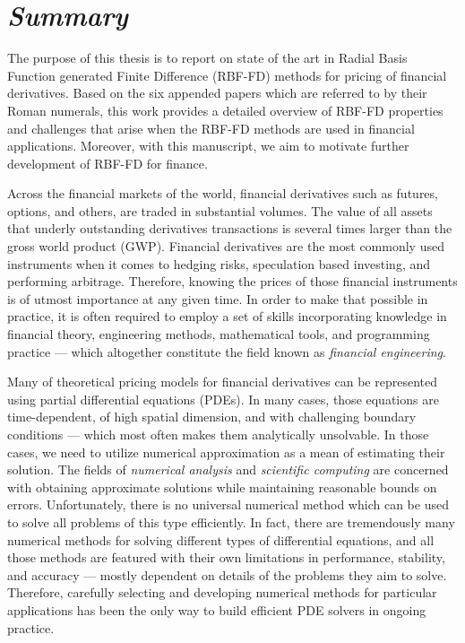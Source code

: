 \documentclass{UUThesisTemplate}
\begin{document}
\chapter{{{\sffamily\emph{Summary}}}}
{\noteunic
\par The purpose of this thesis is to report on state of the art in Radial Basis Function generated Finite Difference (RBF-FD) methods for pricing of financial derivatives. Based on the six appended papers which are referred to by their Roman numerals, this work provides a detailed overview of RBF-FD properties and challenges that arise when the RBF-FD methods are used in financial applications. Moreover, with this manuscript, we aim to motivate further development of RBF-FD for finance.
\par Across the financial markets of the world, financial derivatives such as futures, options, and others, are traded in substantial volumes. The value of all assets that underly outstanding derivatives transactions is several times larger than the gross world product (GWP). Financial derivatives are the most commonly used instruments when it comes to hedging risks, speculation based investing, and performing arbitrage. Therefore, knowing the prices of those financial instruments is of utmost importance at any given time. In order to make that possible in practice, it is often required to employ a set of skills incorporating knowledge in financial theory, engineering methods, mathematical tools, and programming practice --- which altogether constitute the field known as \emph{financial engineering}. 
\par Many of theoretical pricing models for financial derivatives can be represented using partial differential equations (PDEs). In many cases, those equations are time-dependent, of high spatial dimension, and with challenging boundary conditions --- which most often makes them analytically unsolvable. In those cases, we need to utilize numerical approximation as a mean of estimating their solution. The fields of \emph{numerical analysis} and \emph{scientific computing} are concerned with obtaining approximate solutions while maintaining reasonable bounds on errors. Unfortunately, there is no universal numerical method which can be used to solve all problems of this type efficiently. In fact, there are tremendously many numerical methods for solving different types of differential equations, and all those methods are featured with their own limitations in performance, stability, and accuracy --- mostly dependent on details of the problems they aim to solve. Therefore, carefully selecting and developing numerical methods for particular applications has been the only way to build efficient PDE solvers in ongoing practice. 
}
\end{document}
